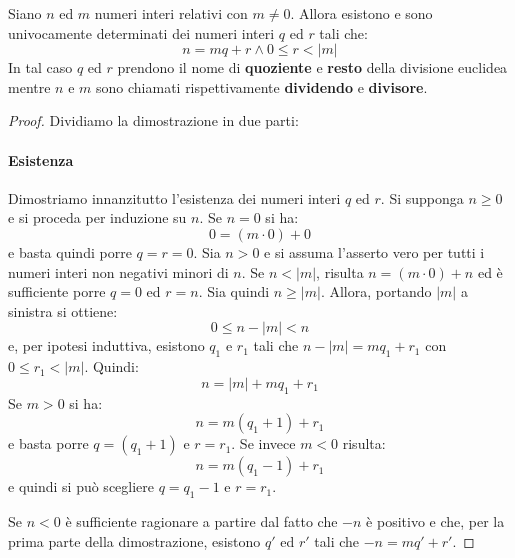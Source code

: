 \begin{teorbox}\label{thm:divisione}
	Siano $n$ ed $m$ numeri interi relativi con $m \neq 0$. Allora esistono e sono univocamente determinati dei numeri interi $q$ ed $r$ tali che:
	\begin{equation}
		n=mq+r \land 0 \leq r < |m|
	\end{equation}
	In tal caso $q$ ed $r$ prendono il nome di \textbf{quoziente} e \textbf{resto} della divisione euclidea mentre $n$ e $m$ sono chiamati rispettivamente \textbf{dividendo} e \textbf{divisore}.
\end{teorbox}

\begin{proof} Dividiamo la dimostrazione in due parti:
		\paragraph{Esistenza} Dimostriamo innanzitutto l'esistenza dei numeri interi $q$ ed $r$. Si supponga $n \geq 0$ e si proceda per induzione su $n$. Se $n=0$ si ha:
		\begin{displaymath}
			0 = ( m \cdot 0) + 0
		\end{displaymath}
		e basta quindi porre $q=r=0$. Sia $n>0$ e si assuma l'asserto vero per tutti i numeri interi non negativi minori di $n$. Se $n < |m|$, risulta $n = (m \cdot 0) + n$ ed è sufficiente porre $q=0$ ed $r=n$. Sia quindi $n \geq |m|$. Allora, portando $|m|$ a sinistra si ottiene:
		\begin{displaymath}
			0 \leq n - |m| < n
		\end{displaymath}
		e, per ipotesi induttiva, esistono $q_{1}$ e $r_{1}$ tali che $n- |m|=mq_{1}+r_{1}$ con $0 \leq r_{1} < |m|$. Quindi: $$n=|m|+mq_{1}+r_{1}$$ Se $m>0$ si ha: $$n=m(q_{1}+1)+r_{1}$$ e basta porre $q=(q_{1}+1)$ e $r=r_{1}$. Se invece $m<0$ risulta: $$n=m(q_{1}-1)+r_{1}$$ e quindi si può scegliere $q=q_{1}-1$ e $r=r_{1}$.
		
		Se $n<0$ è sufficiente ragionare a partire dal fatto che $-n$ è positivo e che, per la prima parte della dimostrazione, esistono $q'$ ed $r'$ tali che $-n=mq'+r'$.
		

\end{proof}
